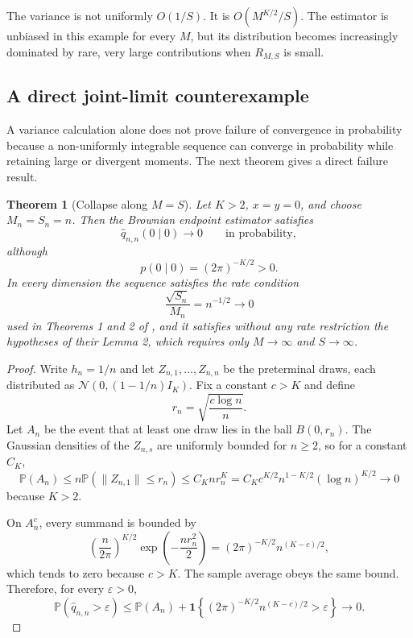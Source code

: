 \documentclass[11pt]{article}
\newtheorem{theorem}{Theorem}[section]
\theoremstyle{definition}
\newcommand{\Pp}{\mathbb{P}}
\newcommand{\Normal}{\mathcal{N}}
\begin{document}
The variance is not uniformly $O(1/S)$. It is $O(M^{K/2}/S)$. The estimator is unbiased in this example for every $M$, but its distribution becomes increasingly dominated by rare, very large contributions when $R_{M,S}$ is small.

\subsection{A direct joint-limit counterexample}

A variance calculation alone does not prove failure of convergence in probability because a non-uniformly integrable sequence can converge in probability while retaining large or divergent moments. The next theorem gives a direct failure result.

\begin{theorem}[Collapse along $M=S$]\label{thm:collapse}
Let $K>2$, $x=y=0$, and choose $M_n=S_n=n$. Then the Brownian endpoint estimator satisfies
\begin{equation}\label{eq:collapse}
\widehat q_{n,n}(0\mid0)\longrightarrow0
\qquad\text{in probability},
\end{equation}
although
\[
p(0\mid0)=(2\pi)^{-K/2}>0.
\]
In every dimension the sequence satisfies the rate condition
\[
\frac{\sqrt{S_n}}{M_n}=n^{-1/2}\longrightarrow0
\]
used in Theorems 1 and 2 of \citet{BrandtSantaClara2002}, and it satisfies without any rate restriction the hypotheses of their Lemma 2, which requires only $M\to\infty$ and $S\to\infty$.
\end{theorem}

\begin{proof}
Write $h_n=1/n$ and let $Z_{n,1},\ldots,Z_{n,n}$ be the preterminal draws, each distributed as $\Normal(0,(1-1/n)I_K)$. Fix a constant $c>K$ and define
\[
r_n=\sqrt{\frac{c\log n}{n}}.
\]
Let $A_n$ be the event that at least one draw lies in the ball $B(0,r_n)$. The Gaussian densities of the $Z_{n,s}$ are uniformly bounded for $n\ge2$, so for a constant $C_K$,
\[
\Pp(A_n)
\le n\Pp(\|Z_{n,1}\|\le r_n)
\le C_K n r_n^K
=C_Kc^{K/2}n^{1-K/2}(\log n)^{K/2}
\longrightarrow0
\]
because $K>2$.

On $A_n^c$, every summand is bounded by
\[
\left(\frac{n}{2\pi}\right)^{K/2}
\exp\!\left(-\frac{nr_n^2}{2}\right)
=(2\pi)^{-K/2}n^{(K-c)/2},
\]
which tends to zero because $c>K$. The sample average obeys the same bound. Therefore, for every $\varepsilon>0$,
\[
\Pp(\widehat q_{n,n}>\varepsilon)
\le \Pp(A_n)+
\mathbf{1}\!\left\{(2\pi)^{-K/2}n^{(K-c)/2}>\varepsilon\right\}
\longrightarrow0.
\]
\end{proof}
\end{document}
